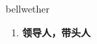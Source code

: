 
\begin{frame}
{\huge bellwether}
\begin{center}
\begin{enumerate}\Large
  \item \textbf{领导人，带头人}
\end{enumerate}
\end{center}
\end{frame}
